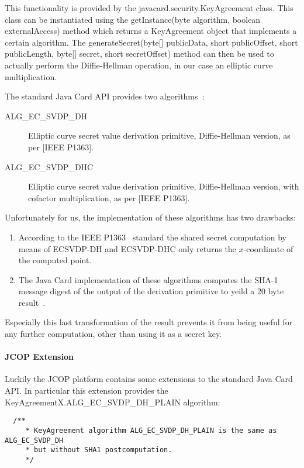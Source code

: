This functionality is provided by the javacard.security.KeyAgreement class. This
class can be instantiated using the getInstance(byte algorithm, boolean externalAccess)
method which returns a KeyAgreement object that implements a certain algorithm.
The generateSecret(byte[] publicData, short publicOffset, short publicLength, byte[] secret, short secretOffset)
method can then be used to actually perform the Diffie-Hellman operation, in our
case an elliptic curve multiplication.

The standard Java Card API provides two algorithms~\cite{JavaCard-2.2.2_API_documentation}:
\begin{description}
  \item[ALG\_EC\_SVDP\_DH] Elliptic curve secret value derivation primitive, Diffie-Hellman version, as per [IEEE P1363].
  \item[ALG\_EC\_SVDP\_DHC] Elliptic curve secret value derivation primitive, Diffie-Hellman version, with cofactor multiplication, as per [IEEE P1363].
\end{description}

Unfortunately for us, the implementation of these algorithms has two drawbacks:
\begin{enumerate}
  \item According to the IEEE P1363~\cite{IEEE_P1363} standard the shared secret computation by means of ECSVDP-DH and ECSVDP-DHC only returns the $x$-coordinate of the computed point.
  \item The Java Card implementation of these algorithms computes the SHA-1 message digest of the output of the derivation primitive to yeild a 20 byte result~\cite{JavaCard-2.2.2_API_documentation}.
\end{enumerate}

Especially this last transformation of the result prevents it from being useful for any further computation, other than using it as a secret key.

\paragraph{JCOP Extension}

Luckily the JCOP platform contains some extensions to the standard Java Card API.
In particular this extension provides the KeyAgreementX.ALG\_EC\_SVDP\_DH\_PLAIN algorithm:

\begin{lstlisting}
  /**
	 * KeyAgreement algorithm ALG_EC_SVDP_DH_PLAIN is the same as ALG_EC_SVDP_DH
	 * but without SHA1 postcomputation.
	 */
\end{lstlisting}

